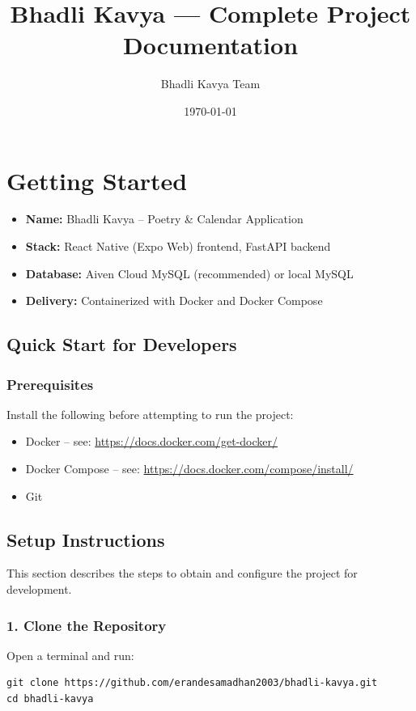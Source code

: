 \documentclass[11pt]{article}
\title{Bhadli Kavya — Complete Project Documentation}
\author{Bhadli Kavya Team}
\date{\today}
\begin{document}
\maketitle
\tableofcontents
\newpage

\section{Getting Started}

\begin{itemize}[leftmargin=*]
	\item \textbf{Name:} Bhadli Kavya -- Poetry \& Calendar Application
	\item \textbf{Stack:} React Native (Expo Web) frontend, FastAPI backend
	\item \textbf{Database:} Aiven Cloud MySQL (recommended) or local MySQL
	\item \textbf{Delivery:} Containerized with Docker and Docker Compose
\end{itemize}

\subsection{Quick Start for Developers}
\subsubsection{Prerequisites}
Install the following before attempting to run the project:
\begin{itemize}
	\item Docker -- see: \url{https://docs.docker.com/get-docker/}
	\item Docker Compose -- see: \url{https://docs.docker.com/compose/install/}
	\item Git
\end{itemize}

\subsection{Setup Instructions}
This section describes the steps to obtain and configure the project for development.

\subsubsection{1. Clone the Repository}
Open a terminal and run:
\begin{Verbatim}[fontsize=\small]
git clone https://github.com/erandesamadhan2003/bhadli-kavya.git
cd bhadli-kavya
\end{Verbatim}
\end{document}
